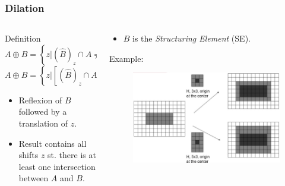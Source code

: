 \begin{frame}
\frametitle{Dilation}
\begin{columns}
\begin{column}{.5\textwidth}
\begin{block}{Definition}
$A \oplus B = \left \{ z | \left ( \hat{B} \right )_{z} \cap A \neq  \emptyset \right \}$\\
$A\oplus B = \left \{ z | [ (\hat{B})_{z} \cap A ] \subseteq A \right \}$
\end{block}
\begin{itemize}
\item Reflexion of $B$ followed by a translation of $z$.
\item Result contains all shifts $z$ st. there is at least one intersection between $A$ and $B$.
\end{itemize}
\end{column}
\begin{column}{.5\textwidth}
\begin{itemize}
\item $B$ is the \textit{Structuring Element} (SE).
\end{itemize}
Example:
\begin{figure}[!h]
\includegraphics[width=\textwidth]{dilation-ex-1}
\end{figure}
\end{column}
\end{columns}
\end{frame}

